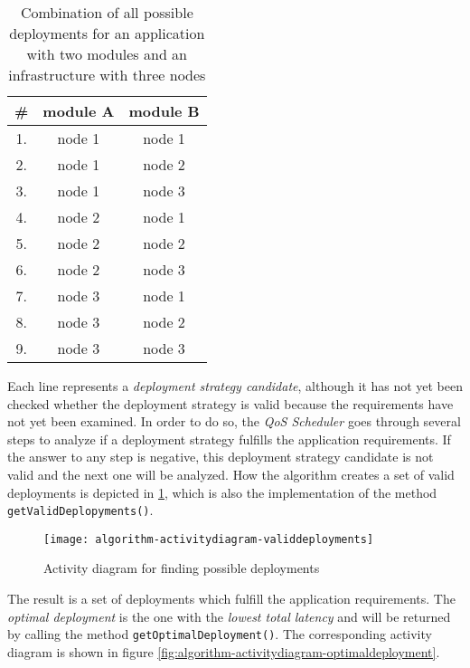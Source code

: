 \begin{table}[htb]
    \centering
    \begin{tabular}{|c||c|c|}
    \hline
        \# & \textbf{module A} & \textbf{module B}\\
         \hline\hline
         1. & node 1 & node 1\\
         \hline
         2. & node 1 & node 2\\
         \hline
         3. & node 1 & node 3\\
         \hline
         4. & node 2 & node 1\\
         \hline
         5. & node 2 & node 2\\
         \hline
         6. & node 2 & node 3\\
         \hline
         7. & node 3 & node 1\\
         \hline
         8. & node 3 & node 2\\
         \hline
         9. & node 3 & node 3\\
         \hline
    \end{tabular}
    \caption{Combination of all possible deployments for an application with two modules and an infrastructure with three nodes}
    \label{tab:deployment-combinations}
\end{table}

Each line represents a \textit{deployment strategy candidate}, although it has not yet been checked whether the deployment strategy is valid because the requirements have not yet been examined.
In order to do so, the \textit{QoS Scheduler} goes through several steps to analyze if a deployment strategy fulfills the application requirements.
If the answer to any step is negative, this deployment strategy candidate is not valid and the next one will be analyzed.
How the algorithm creates a set of valid deployments is depicted in \ref{fig:algorithm-activitydiagram-validdeployments}, which is also the implementation of the method \texttt{getValidDeplopyments()}.

\begin{figure}[htb]
    \centering
    \texttt{[image: algorithm-activitydiagram-validdeployments]}
    \caption{Activity diagram for finding possible deployments}
    \label{fig:algorithm-activitydiagram-validdeployments}
\end{figure}

The result is a set of deployments which fulfill the application requirements. The \textit{optimal deployment} is the one with the \textit{lowest total latency} and will be returned by calling the method \texttt{getOptimalDeployment()}. The corresponding activity diagram is shown in figure \ref{fig:algorithm-activitydiagram-optimaldeployment}.

